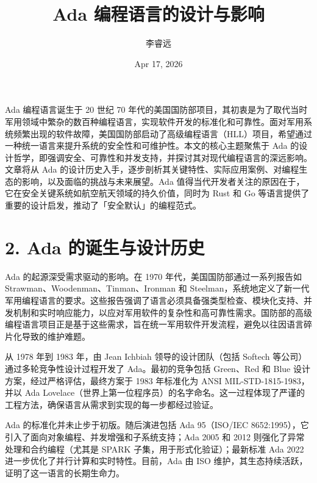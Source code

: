 \title{Ada 编程语言的设计与影响}
\author{李睿远}
\date{Apr 17, 2026}
\maketitle
Ada 编程语言诞生于 20 世纪 70 年代的美国国防部项目，其初衷是为了取代当时军用领域中繁杂的数百种编程语言，实现软件开发的标准化和可靠性。面对军用系统频繁出现的软件故障，美国国防部启动了高级编程语言（HLL）项目，希望通过一种统一语言来提升系统的安全性和可维护性。本文的核心主题聚焦于 Ada 的设计哲学，即强调安全、可靠性和并发支持，并探讨其对现代编程语言的深远影响。文章将从 Ada 的设计历史入手，逐步剖析其关键特性、实际应用案例、对编程生态的影响，以及面临的挑战与未来展望。Ada 值得当代开发者关注的原因在于，它在安全关键系统如航空航天领域的持久价值，同时为 Rust 和 Go 等语言提供了重要的设计启发，推动了「安全默认」的编程范式。\par
\chapter{2. Ada 的诞生与设计历史}
Ada 的起源深受需求驱动的影响。在 1970 年代，美国国防部通过一系列报告如 Strawman、Woodenman、Tinman、Ironman 和 Steelman，系统地定义了新一代军用编程语言的要求。这些报告强调了语言必须具备强类型检查、模块化支持、并发机制和实时响应能力，以应对军用软件的复杂性和高可靠性需求。国防部的高级编程语言项目正是基于这些需求，旨在统一军用软件开发流程，避免以往因语言碎片化导致的维护难题。\par
从 1978 年到 1983 年，由 Jean Ichbiah 领导的设计团队（包括 Softech 等公司）通过多轮竞争性设计过程开发了 Ada。最初的竞争包括 Green、Red 和 Blue 设计方案，经过严格评估，最终方案于 1983 年标准化为 ANSI MIL-STD-1815-1983，并以 Ada Lovelace（世界上第一位程序员）的名字命名。这一过程体现了严谨的工程方法，确保语言从需求到实现的每一步都经过验证。\par
Ada 的标准化并未止步于初版。随后演进包括 Ada 95（ISO/IEC 8652:1995），它引入了面向对象编程、并发增强和子系统支持；Ada 2005 和 2012 则强化了异常处理和合约编程（尤其是 SPARK 子集，用于形式化验证）；最新标准 Ada 2022 进一步优化了并行计算和实时特性。目前，Ada 由 ISO 维护，其生态持续活跃，证明了这一语言的长期生命力。\par
